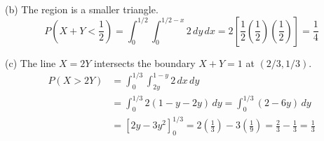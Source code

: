 \documentclass{article}
\begin{document}
(b) The region is a smaller triangle.
$$P\left(X +Y < \frac{1}{2}\right) = \int_{0}^{1/2} \int_{0}^{1/2-x} 2 \,dy \,dx = 2 \left[ \frac{1}{2} \left(\frac{1}{2}\right) \left(\frac{1}{2}\right) \right] = \frac{1}{4}$$

(c) The line $X=2Y$ intersects the boundary $X+Y=1$ at $(2/3, 1/3)$.
\begin{align*}
P(X > 2Y) &= \int_{0}^{1/3} \int_{2y}^{1-y} 2 \,dx \,dy \\
&= \int_{0}^{1/3} 2(1 - y - 2y) \,dy = \int_{0}^{1/3} (2 - 6y) \,dy \\
&= \left[ 2y - 3y^2 \right]_{0}^{1/3} = 2\left(\frac{1}{3}\right) - 3\left(\frac{1}{9}\right) = \frac{2}{3} - \frac{1}{3} = \frac{1}{3}
\end{align*}
\end{document}
